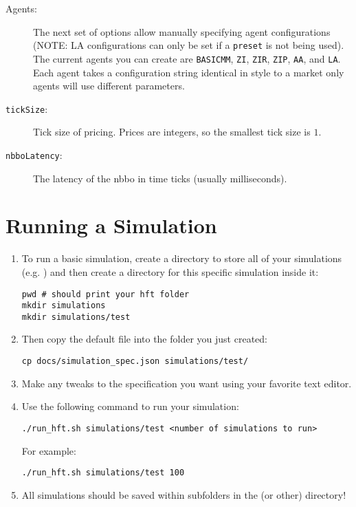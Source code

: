 \documentclass[11pt]{article}
\begin{document}
\begin{description}
\item[Agents:] The next set of options allow manually specifying agent
  configurations (NOTE: LA configurations can only be set if a \texttt{preset}
  is not being used). The current agents you can create are \texttt{BASICMM},
  \texttt{ZI}, \texttt{ZIR}, \texttt{ZIP}, \texttt{AA}, and \texttt{LA}. Each
  agent takes a configuration string identical in style to a market only agents
  will use different parameters.

\item[\texttt{tickSize}:] Tick size of pricing. Prices are integers, so the
  smallest tick size is $1$.

\item[\texttt{nbboLatency}:] The latency of the nbbo in time ticks (usually
  milliseconds).

\end{description}

\section{Running a Simulation}

\begin{enumerate}
\item To run a basic simulation, create a directory to store all of your
  simulations (e.g. ) and then create a directory for this
  specific simulation inside it:

\begin{verbatim}
pwd # should print your hft folder
mkdir simulations
mkdir simulations/test
\end{verbatim}

\item Then copy the default  file into the folder you
  just created:

\begin{verbatim}
cp docs/simulation_spec.json simulations/test/
\end{verbatim}

\item Make any tweaks to the specification you want using your favorite text
  editor.

\item Use the following command to run your simulation:

\begin{verbatim}
./run_hft.sh simulations/test <number of simulations to run>
\end{verbatim}

For example:

\begin{verbatim}
./run_hft.sh simulations/test 100
\end{verbatim}

\item All simulations should be saved within subfolders in the 
(or other) directory!

\end{enumerate}
\end{document}
